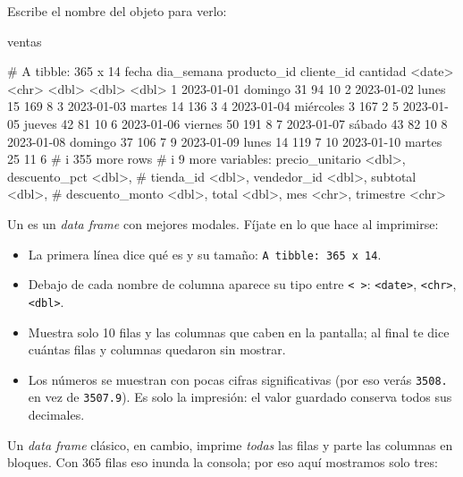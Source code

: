 Escribe el nombre del objeto para verlo:

\begin{rcode}
ventas
\end{rcode}
\begin{rsalida}
# A tibble: 365 x 14
   fecha      dia_semana producto_id cliente_id cantidad
   <date>     <chr>            <dbl>      <dbl>    <dbl>
 1 2023-01-01 domingo             31         94       10
 2 2023-01-02 lunes               15        169        8
 3 2023-01-03 martes              14        136        3
 4 2023-01-04 miércoles            3        167        2
 5 2023-01-05 jueves              42         81       10
 6 2023-01-06 viernes             50        191        8
 7 2023-01-07 sábado              43         82       10
 8 2023-01-08 domingo             37        106        7
 9 2023-01-09 lunes               14        119        7
10 2023-01-10 martes              25         11        6
# i 355 more rows
# i 9 more variables: precio_unitario <dbl>, descuento_pct <dbl>,
#   tienda_id <dbl>, vendedor_id <dbl>, subtotal <dbl>,
#   descuento_monto <dbl>, total <dbl>, mes <chr>, trimestre <chr>
\end{rsalida}

Un  es un \emph{data frame} con mejores modales. Fíjate en
lo que hace al imprimirse:

\begin{itemize}
  \item La primera línea dice qué es y su tamaño: \texttt{A tibble: 365 x 14}.
  \item Debajo de cada nombre de columna aparece su tipo entre
        \texttt{< >}: \texttt{<date>}, \texttt{<chr>}, \texttt{<dbl>}.
  \item Muestra solo 10 filas y las columnas que caben en la pantalla; al
        final te dice cuántas filas y columnas quedaron sin mostrar.
  \item Los números se muestran con pocas cifras significativas (por eso
        verás \texttt{3508.} en vez de \texttt{3507.9}). Es solo la
        impresión: el valor guardado conserva todos sus decimales.
\end{itemize}

Un \emph{data frame} clásico, en cambio, imprime \emph{todas} las filas y
parte las columnas en bloques. Con 365 filas eso inunda la consola; por eso
aquí mostramos solo tres:

